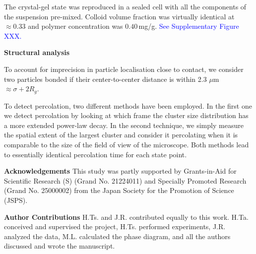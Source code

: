 \documentclass[preprint,amsmath,amssymb,superscriptaddress]{revtex4-1}
\begin{document}
The crystal-gel state was reproduced in a sealed cell with all the components of the suspension pre-mixed. Colloid volume fraction was virtually identical at $\approx 0.33$ and polymer concentration was $0.40\,$mg/g. \textcolor{blue}{See Supplementary Figure XXX.}





%

\noindent
{\bf Structural analysis}

To account for imprecision in particle localisation close to contact, we consider two particles bonded if their center-to-center distance is within 2.3 $\mu$m $\approx\sigma+2R_g$.

To detect percolation, two different methods have been employed. In the first one we detect percolation
by looking at which frame the cluster size distribution has a more extended power-law decay. In the second technique,
we simply measure the spatial extent of the largest cluster and consider it percolating when it is comparable to the
size of the field of view of the microscope. Both methods lead to essentially identical percolation time for each state point.






\vspace{1cm}
\noindent
{\bf Acknowledgements} 
This study was partly supported by Grants-in-Aid for Scientific Research (S) (Grand No. 21224011) and Specially Promoted Research (Grand No. 25000002) from the Japan Society for the Promotion of Science (JSPS). 

\vspace{0.3cm}
\noindent
{\bf Author Contributions} 
H.Ts. and J.R. contributed equally to this work. 
H.Ta. conceived and supervised the project, H.Ts. performed experiments, J.R. analyzed the data, M.L. calculated the phase diagram, and all the authors discussed and wrote the manuscript. 
\end{document}
